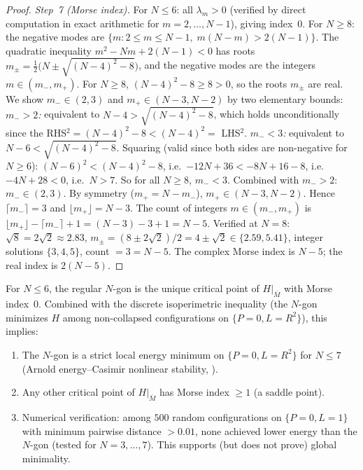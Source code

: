 \begin{proof}
\emph{Step~7 (Morse index).}
For $N \le 6$: all $\lambda_m > 0$ (verified by direct
computation in exact arithmetic for $m = 2, \ldots, N{-}1$),
giving index~$0$.
For $N \ge 8$: the negative modes are
$\{m : 2 \le m \le N{-}1,\; m(N{-}m) > 2(N{-}1)\}$.
The quadratic inequality $m^2 - Nm + 2(N{-}1) < 0$
has roots
$m_{\pm} = \tfrac{1}{2}\bigl(N \pm \sqrt{(N{-}4)^2 - 8}\bigr)$,
and the negative modes are the integers
$m \in (m_-, m_+)$.
For $N \ge 8$, $(N{-}4)^2 - 8 \ge 8 > 0$, so the roots
$m_\pm$ are real.  We show $m_- \in (2, 3)$ and
$m_+ \in (N{-}3, N{-}2)$ by two elementary bounds:
\emph{$m_- > 2$:} equivalent to $N{-}4 > \sqrt{(N{-}4)^2{-}8}$,
which holds unconditionally since the RHS${}^2 =
(N{-}4)^2 - 8 < (N{-}4)^2 =$ LHS${}^2$.
\emph{$m_- < 3$:} equivalent to $N{-}6 < \sqrt{(N{-}4)^2{-}8}$.
Squaring (valid since both sides are non-negative for $N \ge 6$):
$(N{-}6)^2 < (N{-}4)^2 - 8$, i.e.\
$-12N + 36 < -8N + 16 - 8$, i.e.\ $-4N + 28 < 0$,
i.e.\ $N > 7$.  So for all $N \ge 8$, $m_- < 3$.
Combined with $m_- > 2$: $m_- \in (2, 3)$.
By symmetry ($m_+ = N - m_-$), $m_+ \in (N{-}3, N{-}2)$.
Hence $\lceil m_- \rceil = 3$ and $\lfloor m_+ \rfloor = N{-}3$.
The count of integers $m \in (m_-, m_+)$ is
$\lfloor m_+ \rfloor - \lceil m_- \rceil + 1
= (N{-}3) - 3 + 1 = N - 5$.
Verified at $N = 8$: $\sqrt{8} = 2\sqrt{2} \approx 2.83$,
$m_\pm = (8 \pm 2\sqrt{2})/2 = 4 \pm \sqrt{2}
\in \{2.59, 5.41\}$, integer solutions $\{3, 4, 5\}$,
count $= 3 = N - 5$.
The complex Morse index is $N{-}5$; the real index is
$2(N{-}5)$.
\end{proof}

\begin{proposition}
\label{prop:critical-uniqueness}
For $N \le 6$, the regular $N$-gon is the unique critical
point of $H|_{\bar{M}}$ with Morse index~$0$.
Combined with the discrete isoperimetric inequality
(the $N$-gon minimizes $H$ among non-collapsed
configurations on $\{P = 0, L = R^2\}$), this implies:
\begin{enumerate}
\item The $N$-gon is a strict local energy minimum on
  $\{P = 0, L = R^2\}$ for $N \le 7$ (Arnold
  energy--Casimir nonlinear stability, \citealt{KurakinYudovich2002}).
\item Any other critical point of $H|_{\bar{M}}$ has
  Morse index $\ge 1$ (a saddle point).
\item Numerical verification: among $500$ random
  configurations on $\{P = 0, L = 1\}$ with minimum
  pairwise distance $> 0.01$, none achieved lower
  energy than the $N$-gon (tested for $N = 3, \ldots, 7$).
  This supports (but does not prove) global minimality.
\end{enumerate}
\end{proposition}

